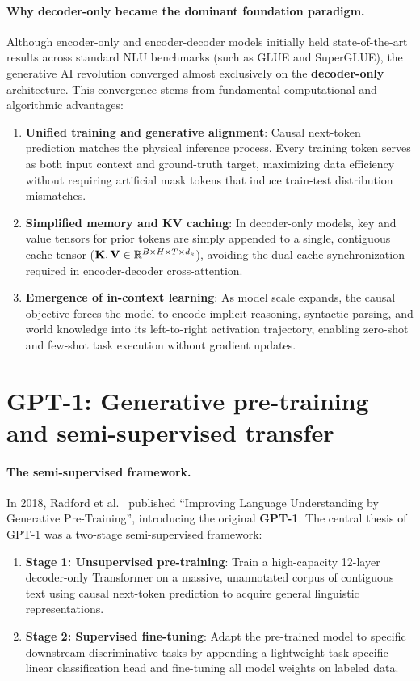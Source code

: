 \documentclass[../../main.tex]{subfiles}
\begin{document}
\paragraph{Why decoder-only became the dominant foundation paradigm.}
Although encoder-only and encoder-decoder models initially held state-of-the-art results across standard NLU benchmarks (such as GLUE and SuperGLUE), the generative AI revolution converged almost exclusively on the \textbf{decoder-only} architecture. This convergence stems from fundamental computational and algorithmic advantages:
\begin{enumerate}
    \item \textbf{Unified training and generative alignment}: Causal next-token prediction matches the physical inference process. Every training token serves as both input context and ground-truth target, maximizing data efficiency without requiring artificial mask tokens that induce train-test distribution mismatches.
    \item \textbf{Simplified memory and KV caching}: In decoder-only models, key and value tensors for prior tokens are simply appended to a single, contiguous cache tensor ($\mathbf{K}, \mathbf{V} \in \mathbb{R}^{B \times H \times T \times d_k}$), avoiding the dual-cache synchronization required in encoder-decoder cross-attention.
    \item \textbf{Emergence of in-context learning}: As model scale expands, the causal objective forces the model to encode implicit reasoning, syntactic parsing, and world knowledge into its left-to-right activation trajectory, enabling zero-shot and few-shot task execution without gradient updates.
\end{enumerate}

\section{GPT-1: Generative pre-training and semi-supervised transfer}
\label{sec:gpt1_architecture}

\paragraph{The semi-supervised framework.}
In 2018, Radford et al.~\cite{radford2018} published ``Improving Language Understanding by Generative Pre-Training'', introducing the original \textbf{GPT-1}. The central thesis of GPT-1 was a two-stage semi-supervised framework:
\begin{enumerate}
    \item \textbf{Stage 1: Unsupervised pre-training}: Train a high-capacity 12-layer decoder-only Transformer on a massive, unannotated corpus of contiguous text using causal next-token prediction to acquire general linguistic representations.
    \item \textbf{Stage 2: Supervised fine-tuning}: Adapt the pre-trained model to specific downstream discriminative tasks by appending a lightweight task-specific linear classification head and fine-tuning all model weights on labeled data.
\end{enumerate}
\end{document}
